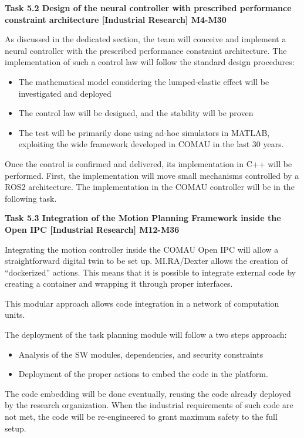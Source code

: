 \begin{longtable}[]
{\begin{minipage}[t]{\linewidth}
\textbf{Task 5.2 Design of the neural controller with prescribed
performance constraint architecture {[}Industrial Research{]} M4-M30}

As discussed in the dedicated section, the team will conceive and
implement a neural controller with the prescribed performance constraint
architecture. The implementation of such a control law will follow the
standard design procedures:

\begin{itemize}
\item
  The mathematical model considering the lumped-elastic effect will be
  investigated and deployed
\item
  The control law will be designed, and the stability will be proven
\item
  The test will be primarily done using ad-hoc simulators in MATLAB,
  exploiting the wide framework developed in COMAU in the last 30 years.
\end{itemize}

Once the control is confirmed and delivered, its implementation in C++
will be performed. First, the implementation will move small mechanisms
controlled by a ROS2 architecture. The implementation in the COMAU
controller will be in the following task.

\textbf{Task 5.3 Integration of the Motion Planning Framework inside the
Open IPC {[}Industrial Research{]} M12-M36}

Integrating the motion controller inside the COMAU Open IPC will allow a
straightforward digital twin to be set up. MI.RA/Dexter allows the
creation of ``dockerized'' actions. This means that it is possible to
integrate external code by creating a container and wrapping it through
proper interfaces.

This modular approach allows code integration in a network of
computation units.

The deployment of the task planning module will follow a two steps
approach:

\begin{itemize}
\item
  Analysis of the SW modules, dependencies, and security constraints
\item
  Deployment of the proper actions to embed the code in the platform.
\end{itemize}

The code embedding will be done eventually, reusing the code already
deployed by the research organization. When the industrial requirements
of such code are not met, the code will be re-engineered to grant
maximum safety to the full setup.


\end{minipage}}
\end{longtable}
